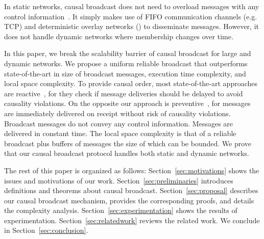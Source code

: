 In static networks, causal broadcast does not need to overload messages with any
control information~\cite{friedman2004causal}.  It
simply makes use of FIFO communication channels (e.g. TCP) and deterministic
overlay networks (\REF) to disseminate messages. However, it does not handle
dynamic networks where membership changes over time.

In this paper, we break the scalability barrier of causal broadcast for large
and dynamic networks. We propose a uniform reliable broadcast that outperforms
state-of-the-art in size of broadcast messages, execution time complexity, and
local space complexity.
To provide causal order, most state-of-the-art approaches are
reactive~\cite{almeida2008interval,fidge1988timestamps,hadzilacos1993fault,mattern1989virtual,mostefaoui2017probabilistic,singhal1992efficient},
for they check if message deliveries should be delayed to avoid causality
violations. On the opposite our approach is
preventive~\cite{birman1987reliable,friedman2004causal}, for messages are
immediately delivered on receipt without risk of causality violations. Broadcast
messages do not convey any control information. Messages are delivered in
constant time. The local space complexity is that of a reliable broadcast plus
buffers of messages the size of which can be bounded.  We prove that our causal
broadcast protocol handles both static and dynamic networks.


The rest of this paper is organized as follows: Section~\ref{sec:motivations}
shows the issues and motivations of our work. Section~\ref{sec:preliminaries}
introduces definitions and theorems about causal
broadcast. Section~\ref{sec:proposal} describes our causal broadcast mechanism,
provides the corresponding proofs, and details the complexity
analysis. Section~\ref{sec:experimentation} shows the results of
experimentation.  Section~\ref{sec:relatedwork} reviews the related work. We
conclude in Section~\ref{sec:conclusion}.




